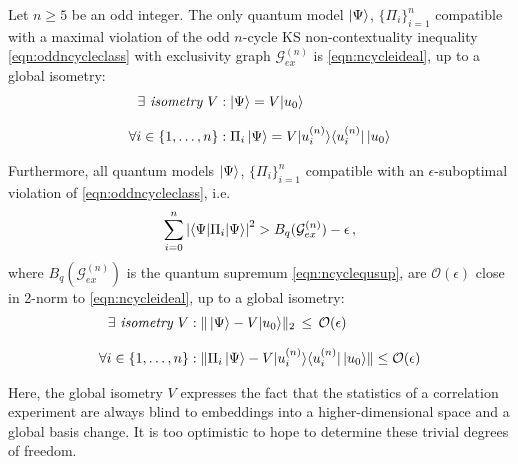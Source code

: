 \begin{theorem}
\label{thm:contselftesting}\hfill\break
Let $n\geq5$ be an odd integer. The only quantum model $\ket{\Psi}$, $\{\Pi_i\}_{i=1}^n$ compatible with a maximal violation of the odd $n$-cycle KS non-contextuality inequality \ref{eqn:oddncycleclass} with exclusivity graph $\mathcal{G}_{ex}^{(n)}$ is \ref{eqn:ncycleideal}, up to a global isometry:
\begin{align*}
    \exists \emph{ isometry } V & : \ket{\Psi} = V \vert u_0\rangle \\[0.7em]
    \forall i\in\{1,\dots,n\} & : \Pi_i \ket{\Psi} = V \vert u_i^{(n)} \rangle \langle u_i^{(n)} \vert \thinspace \vert u_0 \rangle
\end{align*}

Furthermore, all quantum models $\ket{\Psi}$, $\{\Pi_i\}_{i=1}^n$ compatible with an $\epsilon$-suboptimal violation of \ref{eqn:oddncycleclass}, i.e.\
\begin{equation*}
    \sum_{i=0}^n \abs{\langle \Psi \vert \Pi_i \vert \Psi \rangle}^2> B_q(\mathcal{G}_{ex}^{(n)})-\epsilon\thinspace ,
\end{equation*}where $B_q(\mathcal{G}_{ex}^{(n)})$ is the quantum supremum \ref{eqn:ncyclequsup}, are $\mathcal{O}(\epsilon)$ close in 2-norm to \ref{eqn:ncycleideal}, up to a global isometry:
\begin{align*}
    \exists \emph{ isometry } V & : \| \ket{\Psi} - V \vert u_0\rangle \|_2 \thinspace\leq\thinspace \mathcal{O}(\epsilon)\\[0.7em]
    \forall i\in\{1,\dots,n\} & : \| \Pi_i \ket{\Psi} - V \vert u_i^{(n)} \rangle \langle u_i^{(n)} \vert \thinspace \vert u_0 \rangle \| \leq \mathcal{O}(\epsilon)
\end{align*}
\end{theorem}

Here, the global isometry $V$ expresses the fact that the statistics of a correlation experiment are always blind to embeddings into a higher-dimensional space and a global basis change. It is too optimistic to hope to determine these trivial degrees of freedom. 

